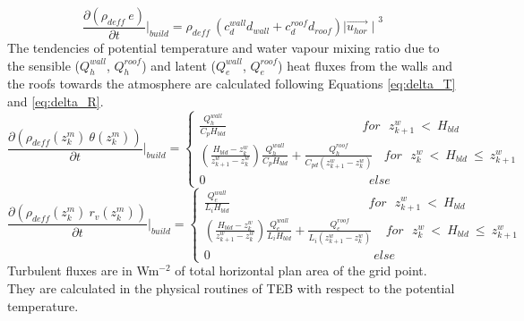 %
\begin{equation}
\label{eq:tke}
\frac{\partial (\rho_{deff} \ e)}{\partial t} \bigg\vert_{build} = \rho_{deff} \ \left(c_{d}^{wall}d_{wall} + c_{d}^{roof}d_{roof} \right) 
{\mid \vec{u_{hor}} \mid}^{3}
\end{equation}
%  
The tendencies of potential temperature and water vapour mixing ratio due to the sensible
($Q^{wall}_{h}$, $Q^{roof}_{h}$) and latent ($Q^{wall}_{e}$, $Q^{roof}_{e}$) heat fluxes from the
walls and the roofs towards the atmosphere are calculated following
Equations \ref{eq:delta_T} and \ref{eq:delta_R}.
%
\begin{equation}
\label{eq:delta_T}
\frac{\partial (\rho_{deff}(z^{m}_{k}) \ \theta(z^{m}_{k}))}{\partial t} \bigg\vert_{build} = 
\begin{cases}
\frac{Q^{wall}_{h}}{C_{p} H_{bld}} \ \ \ \ \ \ \ \ \ \ \ \ \ \ \ \ \ \ \ \ \ \ \ \ \ \ \ \ \ \ \ \ \ \ \ \ \ \ \ \ \ \ \ \ \ \ \ \ \ for \ \ \ z^{w}_{k+1} \ < \ H_{bld} \\
\left( \frac{H_{bld} - z^{w}_{k}}{z^{w}_{k+1}-z^{w}_{k}} \right) \frac{Q^{wall}_{h}}{C_{p} H_{bld}} + \frac{Q^{roof}_{h}}{C_{pd} (z^{w}_{k+1}-z^{w}_{k})} \ \ \ \ for \ \ \ z^{w}_{k} \ < \ H_{bld} \ \leq \ z^{w}_{k+1} \\
0 \ \ \ \ \ \ \ \ \ \ \ \ \ \ \ \ \ \ \ \ \ \ \ \ \ \ \ \ \ \ \ \ \ \ \ \ \ \ \ \ \ \ \ \ \ \ \ \ \ \ \ \ \ \ \ \ \ \ \ else
\end{cases}
\end{equation}
%
\begin{equation}
\label{eq:delta_R}
\frac{\partial (\rho_{deff}(z^{m}_{k}) \ r_v(z^{m}_{k}))}{\partial t} \bigg\vert_{build} =  
\begin{cases}
\frac{Q^{wall}_{e}}{L_{i} H_{bld}} \ \ \ \ \ \ \ \ \ \ \ \ \ \ \ \ \ \ \ \ \ \ \ \ \ \ \ \ \ \ \ \ \ \ \ \ \ \ \ \ \ \ \ \ \ \ \ \ \ \ for \ \ \ z^{w}_{k+1} \ < \ H_{bld} \\
\left( \frac{H_{bld} - z^{w}_{k}}{z^{w}_{k+1}-z^{w}_{k}} \right) \frac{Q^{wall}_{e}}{L_{i} H_{bld}} + \frac{Q^{roof}_{e}}{L_i (z^{w}_{k+1}-z^{w}_{k})} \ \ \ \ \ for \ \ \ z^{w}_{k} \ < \ H_{bld} \ \leq \ z^{w}_{k+1} \\
0 \ \ \ \ \ \ \ \ \ \ \ \ \ \ \ \ \ \ \ \ \ \ \ \ \ \ \ \ \ \ \ \ \ \ \ \ \ \ \ \ \ \ \ \ \ \ \ \ \ \ \ \ \ \ \ \ \ \ \ else
\end{cases}
\end{equation}
%
Turbulent fluxes are in Wm$^{-2}$ of total horizontal plan area of the grid point.
They are calculated in the physical routines of TEB with respect to the potential temperature.

